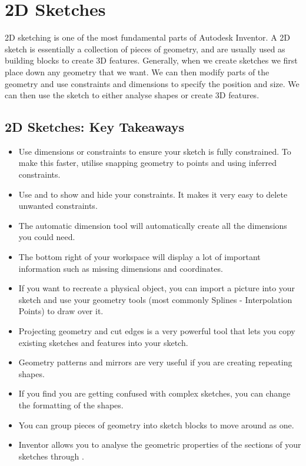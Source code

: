 \chapter{2D Sketches}

2D sketching is one of the most fundamental parts of Autodesk Inventor. A 2D sketch is essentially a collection of pieces of geometry, and are usually used as building blocks to create 3D features. Generally, when we create sketches we first place down any geometry that we want. We can then modify parts of the geometry and use constraints and dimensions to specify the position and size. We can then use the sketch to either analyse shapes or create 3D features.

\section{2D Sketches: Key Takeaways}
\begin{itemize}
\cbstart
{}
\item Use dimensions or constraints to ensure your sketch is fully constrained. To make this faster, utilise snapping geometry to points and using inferred constraints.
\item Use  and  to show and hide your constraints. It makes it very easy to delete unwanted constraints.
\item The automatic dimension tool will automatically create all the dimensions you could need.
\item The bottom right of your workspace will display a lot of important information such as missing dimensions and coordinates.
\item If you want to recreate a physical object, you can import a picture into your sketch and use your geometry tools (most commonly Splines - Interpolation Points) to draw over it.
\item Projecting geometry and cut edges is a very powerful tool that lets you copy existing sketches and features into your sketch.
\item Geometry patterns and mirrors are very useful if you are creating repeating shapes.
\item If you find you are getting confused with complex sketches, you can change the formatting of the shapes.
\item You can group pieces of geometry into sketch blocks to move around as one.
\item Inventor allows you to analyse the geometric properties of the sections of your sketches through .
\cbend
\end{itemize}

